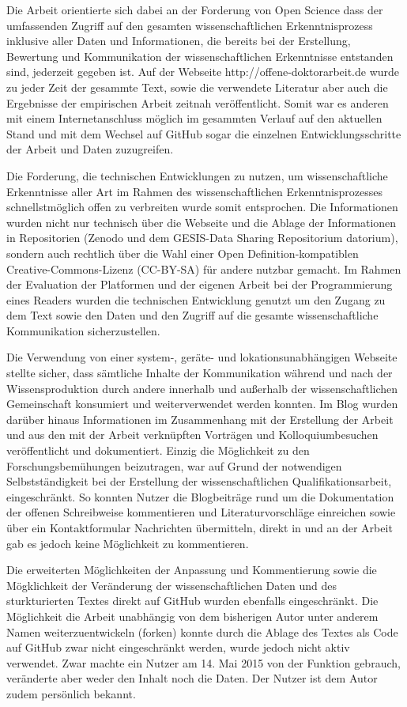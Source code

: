 Die Arbeit orientierte sich dabei an der Forderung von Open Science dass der umfassenden Zugriff auf den gesamten wissenschaftlichen Erkenntnisprozess inklusive aller Daten und Informationen, die bereits bei der Erstellung, Bewertung und Kommunikation der wissenschaftlichen Erkenntnisse entstanden sind, jederzeit gegeben ist. Auf der Webseite http://offene-doktorarbeit.de wurde zu jeder Zeit der gesammte Text, sowie die verwendete Literatur aber auch die Ergebnisse der empirischen Arbeit zeitnah veröffentlicht. Somit war es anderen mit einem Internetanschluss möglich im gesammten Verlauf auf den aktuellen Stand und mit dem Wechsel auf GitHub sogar die einzelnen Entwicklungsschritte der Arbeit und Daten zuzugreifen.

Die Forderung, die technischen Entwicklungen zu nutzen, um wissenschaftliche Erkenntnisse aller Art im Rahmen des wissenschaftlichen Erkenntnisprozesses schnellstmöglich offen zu verbreiten wurde somit entsprochen. Die Informationen wurden nicht nur technisch über die Webseite und die Ablage der Informationen in Repositorien (Zenodo und dem GESIS-Data Sharing Repositorium datorium), sondern auch rechtlich über die Wahl einer Open Definition-kompatiblen Creative-Commons-Lizenz (CC-BY-SA) für andere nutzbar gemacht. Im Rahmen der Evaluation der Platformen und der eigenen Arbeit bei der Programmierung eines Readers wurden die technischen Entwicklung genutzt um den Zugang zu dem Text sowie den Daten und den Zugriff auf die gesamte wissenschaftliche Kommunikation sicherzustellen.

Die Verwendung von einer system-, geräte- und lokationsunabhängigen Webseite stellte sicher, dass sämtliche Inhalte der Kommunikation während und nach der Wissensproduktion durch andere innerhalb und außerhalb der wissenschaftlichen Gemeinschaft konsumiert und weiterverwendet werden konnten. Im Blog wurden darüber hinaus Informationen im Zusammenhang mit der Erstellung der Arbeit und aus den mit der Arbeit verknüpften Vorträgen und Kolloquiumbesuchen veröffentlicht und dokumentiert. Einzig die Möglichkeit zu den Forschungsbemühungen beizutragen, war auf Grund der notwendigen Selbstständigkeit bei der Erstellung der wissenschaftlichen Qualifikationsarbeit, eingeschränkt. So konnten Nutzer die Blogbeiträge rund um die Dokumentation der offenen Schreibweise kommentieren und Literaturvorschläge einreichen sowie über ein Kontaktformular Nachrichten übermitteln, direkt in und an der Arbeit gab es jedoch keine Möglichkeit zu kommentieren.

Die erweiterten Möglichkeiten der Anpassung und Kommentierung sowie die Mögklichkeit der Veränderung der wissenschaftlichen Daten und des sturkturierten Textes direkt auf GitHub wurden ebenfalls eingeschränkt. Die Möglichkeit die Arbeit unabhängig von dem bisherigen Autor unter anderem Namen weiterzuentwickeln (forken) konnte durch die Ablage des Textes als Code auf GitHub zwar nicht eingeschränkt werden, wurde jedoch nicht aktiv verwendet. Zwar machte ein Nutzer am 14. Mai 2015 von der Funktion gebrauch, veränderte aber weder den Inhalt noch die Daten. Der Nutzer ist dem Autor zudem persönlich bekannt.

